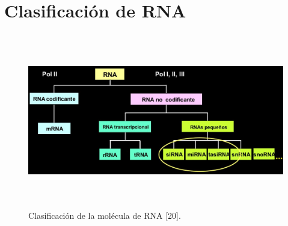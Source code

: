 \chapter{Clasificación de RNA}
\label{clasificacionRNA}

\begin{figure} [h]
	\begin{center}
		\includegraphics[width=5.8209in,height=3.0000in]{image/RNA.jpg}
		\caption{Clasificación de la molécula de RNA [20].}
			\label{rnamol}
	\end{center}
\end{figure}	
